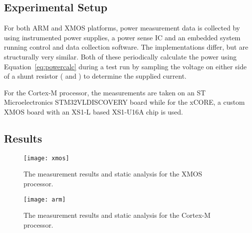 \documentclass[9pt,preprint]{sigplanconf}
\begin{document}
\subsection{Experimental Setup}
For both ARM and XMOS platforms, power measurement data is collected by using
instrumented power supplies, a power sense IC and an embedded
system running control and data collection software. The implementations
differ, but are structurally very similar. Both of these periodically calculate the
power using Equation~\ref{eq:powercalc} during a test run by sampling the
voltage on either side of a shunt resistor ( and )
to determine the supplied current.



For the Cortex-M processor, the measurements are taken on an ST Microelectronics
STM32VLDISCOVERY board while for the xCORE, a custom XMOS board with an
XS1-L based XS1-U16A chip is used.

\subsection{Results}

\begin{figure}
  \centering
  \texttt{[image: xmos]}
  \caption{The measurement results and static analysis for the XMOS processor.}
  \label{fig:xmos_results}
\end{figure}
\begin{figure}
  \centering
  \texttt{[image: arm]}
  \caption{The measurement results and static analysis for the Cortex-M processor.}
  \label{fig:arm_results}
\end{figure}
\end{document}
